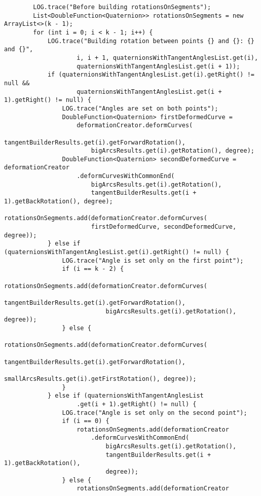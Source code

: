 \begin{verbatim}
        LOG.trace("Before building rotationsOnSegments");
        List<DoubleFunction<Quaternion>> rotationsOnSegments = new ArrayList<>(k - 1);
        for (int i = 0; i < k - 1; i++) {
            LOG.trace("Building rotation between points {} and {}: {} and {}",
                    i, i + 1, quaternionsWithTangentAnglesList.get(i),
                    quaternionsWithTangentAnglesList.get(i + 1));
            if (quaternionsWithTangentAnglesList.get(i).getRight() != null &&
                    quaternionsWithTangentAnglesList.get(i + 1).getRight() != null) {
                LOG.trace("Angles are set on both points");
                DoubleFunction<Quaternion> firstDeformedCurve =
                    deformationCreator.deformCurves(
                        tangentBuilderResults.get(i).getForwardRotation(),
                        bigArcsResults.get(i).getRotation(), degree);
                DoubleFunction<Quaternion> secondDeformedCurve = deformationCreator
                    .deformCurvesWithCommonEnd(
                        bigArcsResults.get(i).getRotation(),
                        tangentBuilderResults.get(i + 1).getBackRotation(), degree);
                rotationsOnSegments.add(deformationCreator.deformCurves(
                        firstDeformedCurve, secondDeformedCurve, degree));
            } else if (quaternionsWithTangentAnglesList.get(i).getRight() != null) {
                LOG.trace("Angle is set only on the first point");
                if (i == k - 2) {
                    rotationsOnSegments.add(deformationCreator.deformCurves(
                            tangentBuilderResults.get(i).getForwardRotation(),
                            bigArcsResults.get(i).getRotation(), degree));
                } else {
                    rotationsOnSegments.add(deformationCreator.deformCurves(
                            tangentBuilderResults.get(i).getForwardRotation(),
                            smallArcsResults.get(i).getFirstRotation(), degree));
                }
            } else if (quaternionsWithTangentAnglesList
                    .get(i + 1).getRight() != null) {
                LOG.trace("Angle is set only on the second point");
                if (i == 0) {
                    rotationsOnSegments.add(deformationCreator
                        .deformCurvesWithCommonEnd(
                            bigArcsResults.get(i).getRotation(),
                            tangentBuilderResults.get(i + 1).getBackRotation(),
                            degree));
                } else {
                    rotationsOnSegments.add(deformationCreator

\end{verbatim}

